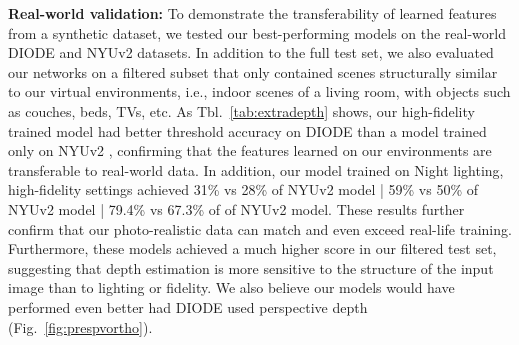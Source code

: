 \documentclass[runningheads]{llncs}
\begin{document}
\noindent\textbf{Real-world validation:} To demonstrate the transferability of learned features from a synthetic dataset, we tested our best-performing models on the real-world DIODE and NYUv2 datasets. In addition to the full test set, we also evaluated our networks on a filtered subset that only contained scenes structurally similar to our virtual environments, i.e., indoor scenes of a living room, with objects such as couches, beds, TVs, etc. As Tbl.~\ref{tab:extradepth} shows, our high-fidelity trained model had better threshold accuracy on DIODE than a model trained only on NYUv2 \cite{diodepaper}, confirming that the features learned on our environments are transferable to real-world data. In addition, our model trained on Night lighting, high-fidelity settings achieved 31\%  vs 28\%  of NYUv2 model | 59\%  vs 50\%  of NYUv2 model | 79.4\%  vs 67.3\% of   of NYUv2 model. These results further confirm that our photo-realistic data can match and even exceed real-life training. Furthermore, these models achieved a much higher score in our filtered test set, suggesting that depth estimation is more sensitive to the structure of the input image than to lighting or fidelity. We also believe our models would have performed even better had DIODE used perspective depth (Fig.~\ref{fig:prespvortho}).
\end{document}
